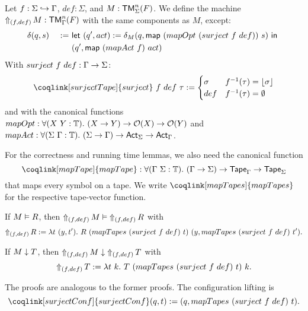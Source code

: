 \begin{definition}
  \label{def:LiftAlphabet}
  Let $f : \Sigma \hookrightarrow \Tau$, $def:\Sigma$, and $M : \TM_\Sigma^n(F)$.  We define the machine %
  $\LiftAlphabet{M}{(f,def)} : \TM_\Tau^n(F)$ with the same components as $M$, except:
  \begin{alignat*}{2}
    & \delta(q,s)    &~:=~& \Let{(q', act) := \delta_M(q, \map{(mapOpt~(surject~f~def))}{s})}{\\%
    &                &~  ~& (q', \map{(mapAct~f)}{act})} \\
  \end{alignat*}
  With $surject~f~def : \Tau \to \Sigma$:
  \[
    \coqlink[surjectTape]{surject}~f~def~\tau :=
    \begin{cases}
      \sigma & f^{-1}(\tau) = \Some{\sigma} \\
      def & f^{-1}(\tau) = \None
    \end{cases}
  \]
  and with the canonical functions $mapOpt: \forall (X~Y:\Type).~ (X \to Y) \to \Option(X) \to \Option(Y)$ and
  $mapAct : \forall (\Sigma~\Tau:\Type).~(\Sigma\to\Tau) \to \Act_\Sigma \to \Act_\Tau$.
\end{definition}

%
For the correctness and running time lemmas, we also need the canonical function
\[
  \coqlink[mapTape]{mapTape}:\forall (\Tau~\Sigma:\Type).~(\Tau\to\Sigma)\to\Tape_\Tau\to\Tape_\Sigma
\]
that maps every symbol on a tape.  We write $\coqlink[mapTapes]{mapTapes}$ for the respective tape-vector function.
%

\begin{lemma}
  \label{lem:LiftAlphabet_Realise}
  If $M \Realise R$, then $\LiftAlphabet{M}{(f,def)} \Realise \LiftAlphabet{R}{(f,def)}$ with
  \small
  \[
    \LiftAlphabet{R}{(f,def)} := \lambda t~(y, t').~R~(mapTapes~(surject~f~def)~t)~(y, mapTapes~(surject~f~def)~t').
  \]
\end{lemma}

\begin{lemma}
  \label{lem:LiftAlphabet_TerminatesIn}
  If $M \TerminatesIn T$, then $\LiftAlphabet{M}{(f,def)} \TerminatesIn \LiftAlphabet{T}{(f,def)}$ with
  \[
    \LiftAlphabet{T}{(f,def)} := \lambda t~k.~T~(mapTapes~(surject~f~def)~t)~k.
  \]
\end{lemma}

The proofs are analogous to the former proofs.  The configuration lifting is
\[
  \coqlink[surjectConf]{surjectConf} (q,t) := (q, mapTapes~(surject~f~def)~t).
\]



